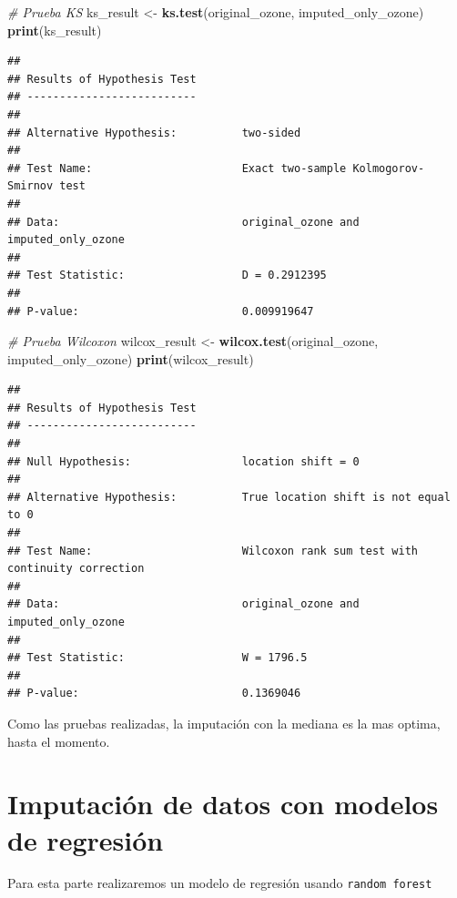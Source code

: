 \documentclass[
]{book}
\newenvironment{Shaded}{\begin{snugshade}}{\end{snugshade}}
\newcommand{\CommentTok}[1]{\textcolor[rgb]{0.56,0.35,0.01}{\textit{#1}}}
\newcommand{\FunctionTok}[1]{\textcolor[rgb]{0.13,0.29,0.53}{\textbf{#1}}}
\newcommand{\NormalTok}[1]{#1}
\newcommand{\OtherTok}[1]{\textcolor[rgb]{0.56,0.35,0.01}{#1}}
\begin{document}
\begin{Shaded}
\begin{Highlighting}[]
\CommentTok{\# Prueba KS}
\NormalTok{ks\_result }\OtherTok{\textless{}{-}} \FunctionTok{ks.test}\NormalTok{(original\_ozone, imputed\_only\_ozone)}
\FunctionTok{print}\NormalTok{(ks\_result)}
\end{Highlighting}
\end{Shaded}

\begin{verbatim}
## 
## Results of Hypothesis Test
## --------------------------
## 
## Alternative Hypothesis:          two-sided
## 
## Test Name:                       Exact two-sample Kolmogorov-Smirnov test
## 
## Data:                            original_ozone and imputed_only_ozone
## 
## Test Statistic:                  D = 0.2912395
## 
## P-value:                         0.009919647
\end{verbatim}

\begin{Shaded}
\begin{Highlighting}[]
\CommentTok{\# Prueba Wilcoxon}
\NormalTok{wilcox\_result }\OtherTok{\textless{}{-}} \FunctionTok{wilcox.test}\NormalTok{(original\_ozone, imputed\_only\_ozone)}
\FunctionTok{print}\NormalTok{(wilcox\_result)}
\end{Highlighting}
\end{Shaded}

\begin{verbatim}
## 
## Results of Hypothesis Test
## --------------------------
## 
## Null Hypothesis:                 location shift = 0
## 
## Alternative Hypothesis:          True location shift is not equal to 0
## 
## Test Name:                       Wilcoxon rank sum test with continuity correction
## 
## Data:                            original_ozone and imputed_only_ozone
## 
## Test Statistic:                  W = 1796.5
## 
## P-value:                         0.1369046
\end{verbatim}

Como las pruebas realizadas, la imputación con la mediana es la mas optima, hasta el momento.

\section{Imputación de datos con modelos de regresión}\label{imputaciuxf3n-de-datos-con-modelos-de-regresiuxf3n}

Para esta parte realizaremos un modelo de regresión usando \texttt{random\ forest}
\end{document}
